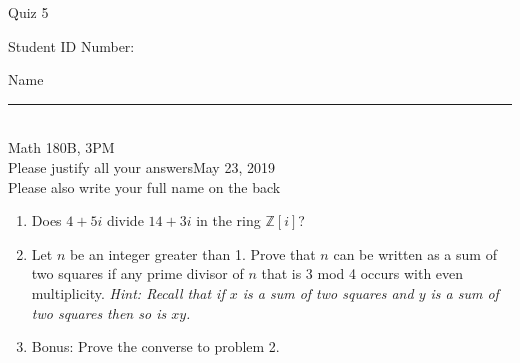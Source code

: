 \documentclass[12pt]{article}
\newcommand{\integers}{\mathbb{Z}}
\begin{document}
\begin{flushleft} 
\centerline{\LARGE{Quiz 5}} 
\vspace{5 mm}
{Student ID Number:}\hfill  
{Name \rule {2 in}{0.01in}}\\
Math 180B, 3PM
\\
{Please justify all your answers}\hfill {May 23, 2019}
\\
{Please also write your full name on the back} 

\medskip
\end{flushleft}

\begin{enumerate}
	\item Does $4+5i$ divide $14+3i$ in the ring $\integers[i]$?
	\vfill
	\item Let $n$ be an integer greater than 1. Prove that $n$ can be written as a sum of two squares if any prime divisor of $n$ that is 3 mod 4 occurs with even multiplicity. \textit{Hint: Recall that if $x$ is a sum of two squares and $y$ is a sum of two squares then so is $xy$.}
	\vfill
	\vfill
	\item Bonus: Prove the converse to problem 2.
	\vfill
\end{enumerate}

\end{document}
